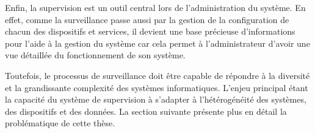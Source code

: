 Enfin, la supervision est un outil central lors de l'administration du système. En effet, comme la surveillance passe aussi par la gestion de la configuration de chacun des dispositifs et services, il devient une base précieuse d'informations pour l'aide à la gestion du système car cela permet à l'administrateur d'avoir une vue détaillée du fonctionnement de son système.

Toutefois, le processus de surveillance doit être capable de répondre à la diversité et la grandissante complexité des systèmes informatiques. L'enjeu principal étant la capacité du système de supervision à s'adapter à l'hétérogénéité des systèmes, des dispositifs et des données. La section suivante présente plus en détail la problématique de cette thèse.